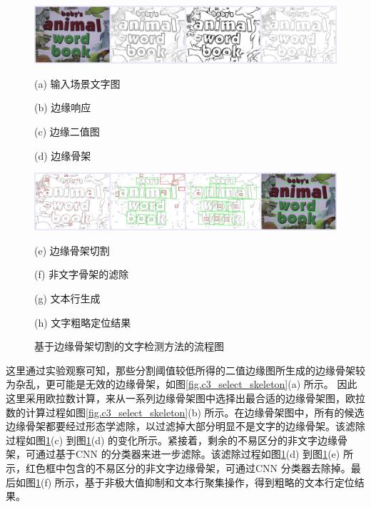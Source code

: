     \begin{figure}[!h]
    \centering
    \includegraphics[width=\textwidth]{./figures/c3_overview_1.jpg}
    \begin{minipage}[t]{0.22\linewidth}
    \centerline{ \small (a) 输入场景文字图}
    \end{minipage}
    \begin{minipage}[t]{0.22\linewidth}
    \centerline{ \small (b) 边缘响应}
    \end{minipage}
    \begin{minipage}[t]{0.22\linewidth}
    \centerline{ \small (c) 边缘二值图}
    \end{minipage}
    \begin{minipage}[t]{0.22\linewidth}
    \centerline{ \small (d) 边缘骨架}
    \end{minipage}
    \includegraphics[width=\textwidth]{./figures/c3_overview_2.jpg}
    \begin{minipage}[t]{0.22\linewidth}
    \centerline{ \small (e) 边缘骨架切割}
    \end{minipage}
    \begin{minipage}[t]{0.22\linewidth}
    \centerline{ \small (f) 非文字骨架的滤除}
    \end{minipage}
    \begin{minipage}[t]{0.22\linewidth}
    \centerline{ \small (g) 文本行生成}
    \end{minipage}
    \begin{minipage}[t]{0.22\linewidth}
    \centerline{ \small (h) 文字粗略定位结果}
    \end{minipage}
    \caption{基于边缘骨架切割的文字检测方法的流程图}
    \label{fig.c3_overview}
    \end{figure}

    这里通过实验观察可知，那些分割阈值较低所得的二值边缘图所生成的边缘骨架较为杂乱，更可能是无效的边缘骨架，如图\ref{fig.c3_select_skeleton}(a) 所示。
    因此这里采用欧拉数计算，来从一系列边缘骨架图中选择出最合适的边缘骨架图，欧拉数的计算过程如图\ref{fig.c3_select_skeleton}(b) 所示。在边缘骨架图中，所有的候选边缘骨架都要经过形态学滤除，以过滤掉大部分明显不是文字的边缘骨架。该滤除过程如图\ref{fig.c3_overview}(c) 到图\ref{fig.c3_overview}(d) 的变化所示。紧接着，剩余的不易区分的非文字边缘骨架，可通过基于CNN 的分类器来进一步滤除。该滤除过程如图\ref{fig.c3_overview}(d) 到图\ref{fig.c3_overview}(e) 所示，红色框中包含的不易区分的非文字边缘骨架，可通过CNN 分类器去除掉。最后如图\ref{fig.c3_overview}(f) 所示，基于非极大值抑制和文本行聚集操作，得到粗略的文本行定位结果。

